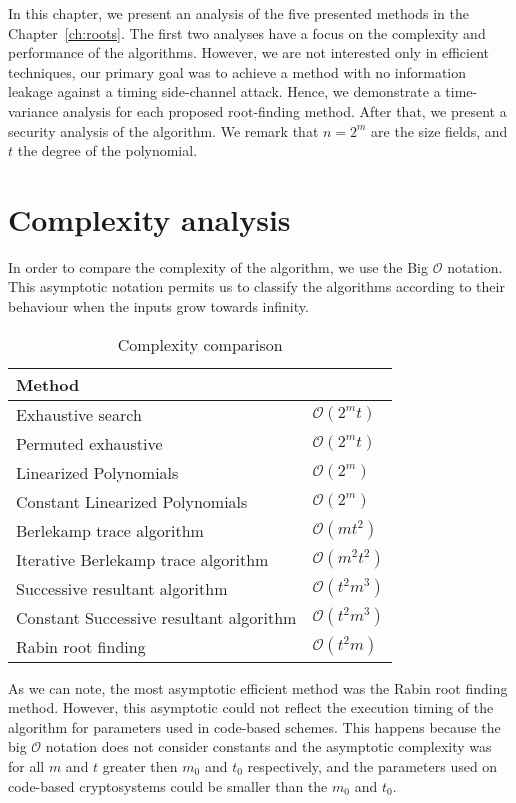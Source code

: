 In this chapter, we present an analysis of the five presented methods in the Chapter~\ref{ch:roots}. The first two analyses have a focus on the complexity and performance of the algorithms. However, we are not interested only in efficient techniques, our primary goal was to achieve a method with no information leakage against a timing side-channel attack. Hence, we demonstrate a time-variance analysis for each proposed root-finding method. After that, we present a security analysis of the algorithm. We remark that $n = 2^m$ are the size fields, and $t$ the degree of the polynomial.

\section{Complexity analysis}
In order to compare the complexity of the algorithm, we use the Big $\mathcal{O}$ notation. This asymptotic notation permits us to classify the algorithms according to their behaviour when the inputs grow towards infinity. 

\begin{table}[ht]
\centering
\label{tab:complexity}
\caption{Complexity comparison}
\begin{tabular}{ll}
Method                                  &                \\ \hline
Exhaustive search                       & $\mathcal{O}(2^mt)$ \\
Permuted exhaustive                     & $\mathcal{O}(2^mt)$ \\
Linearized Polynomials                  & $\mathcal{O}(2^m)$ \\
Constant Linearized Polynomials         & $\mathcal{O}(2^m)$ \\
Berlekamp trace algorithm               & $\mathcal{O}(mt^2)$ \\
Iterative Berlekamp trace algorithm     & $\mathcal{O}(m^2t^2)$ \\
Successive resultant algorithm          & $\mathcal{O}(t^2m^3)$ \\
Constant Successive resultant algorithm & $\mathcal{O}(t^2m^3)$ \\
Rabin root finding                      & $\mathcal{O}(t^2m)$
\end{tabular}
\end{table}

As we can note, the most asymptotic efficient method was the Rabin root finding method. However, this asymptotic could not reflect the execution timing of the algorithm for parameters used in code-based schemes. This happens because the big $\mathcal{O}$ notation does not consider constants and the asymptotic complexity was for all $m$ and $t$ greater then $m_0$ and $t_0$ respectively, and the parameters used on code-based cryptosystems could be smaller than the $m_0$ and $t_0$.

